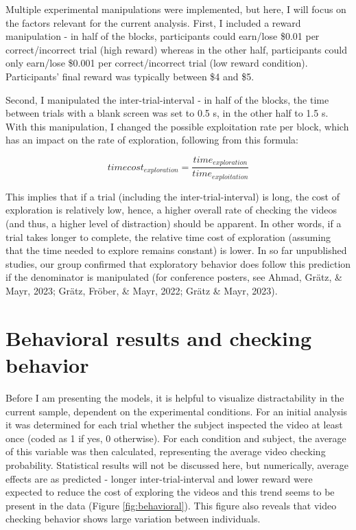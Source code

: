\documentclass[
  man]{apa6}
\begin{document}
Multiple experimental manipulations were implemented, but here, I will focus on the factors relevant for the current analysis. First, I included a reward manipulation - in half of the blocks, participants could earn/lose \$0.01 per correct/incorrect trial (high reward) whereas in the other half, participants could only earn/lose \$0.001 per correct/incorrect trial (low reward condition). Participants' final reward was typically between \$4 and \$5.

Second, I manipulated the inter-trial-interval - in half of the blocks, the time between trials with a blank screen was set to 0.5 s, in the other half to 1.5 s. With this manipulation, I changed the possible exploitation rate per block, which has an impact on the rate of exploration, following from this formula:

\[time cost_{exploration} = \frac{time_{exploration}}{time_{exploitation}}\]

This implies that if a trial (including the inter-trial-interval) is long, the cost of exploration is relatively low, hence, a higher overall rate of checking the videos (and thus, a higher level of distraction) should be apparent. In other words, if a trial takes longer to complete, the relative time cost of exploration (assuming that the time needed to explore remains constant) is lower. In so far unpublished studies, our group confirmed that exploratory behavior does follow this prediction if the denominator is manipulated (for conference posters, see Ahmad, Grätz, \& Mayr, 2023; Grätz, Fröber, \& Mayr, 2022; Grätz \& Mayr, 2023).

\hypertarget{behavioral-results-and-checking-behavior}{%
\section{Behavioral results and checking behavior}\label{behavioral-results-and-checking-behavior}}

Before I am presenting the models, it is helpful to visualize distractability in the current sample, dependent on the experimental conditions. For an initial analysis it was determined for each trial whether the subject inspected the video at least once (coded as 1 if yes, 0 otherwise). For each condition and subject, the average of this variable was then calculated, representing the average video checking probability. Statistical results will not be discussed here, but numerically, average effects are as predicted - longer inter-trial-interval and lower reward were expected to reduce the cost of exploring the videos and this trend seems to be present in the data (Figure \ref{fig:behavioral}). This figure also reveals that video checking behavior shows large variation between individuals.
\end{document}

